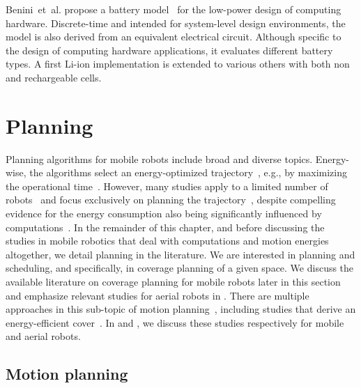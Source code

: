 Benini~et~al. propose a battery model~\citep{benini2001discrete} for the low-power design of computing hardware. Discrete-time and intended for system-level design environments, the model is also derived from an equivalent electrical circuit. Although specific to the design of computing hardware applications, it evaluates different battery types. A first Li-ion implementation is extended to various others with both non and rechargeable cells.


\section{Planning}
\label{sec:soa-motion-pl}

Planning algorithms for mobile robots include broad and diverse topics. Energy-wise, the algorithms select an energy-optimized trajectory~\citep{mei2004energy}, e.g., by maximizing the operational time~\citep{wahab2015energy}. However, many studies apply to a limited number of robots~\citep{kim2005energy} and focus exclusively on planning the trajectory~\citep{kim2008minimum}, despite compelling evidence for the energy consumption also being significantly influenced by computations~\citep{ondruska2015scheduled,mei2005case}. 
In the remainder of this chapter, and before discussing the studies in mobile robotics that deal with computations and motion energies altogether, we detail planning in the literature. 
We are interested in planning and scheduling, and specifically, in coverage planning of a given space. We discuss the available literature on coverage planning for mobile robots later in this section and emphasize relevant studies for aerial robots in . There are multiple approaches in this sub-topic of motion planning~\citep{choset2001coverage,cabreira2019survey}, including studies that derive an energy-efficient cover~\citep{wei2018coverage,cabreira2018energy}. In  and , we discuss these studies respectively for mobile and aerial robots. 

\subsection{Motion planning}

